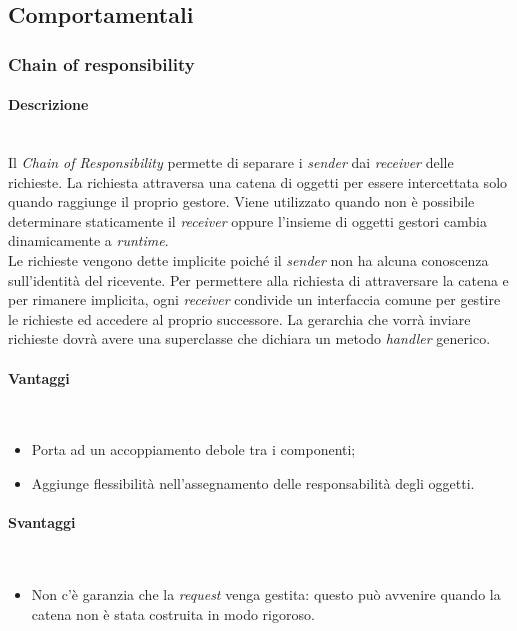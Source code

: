 \subsection{Comportamentali}
\subsubsection{Chain of responsibility}
\paragraph{Descrizione} \mbox{} \\
Il \textit{Chain of Responsibility} permette di separare i \textit{sender} dai \textit{receiver} delle richieste. La richiesta attraversa una catena di oggetti per essere intercettata solo quando raggiunge il proprio gestore. Viene utilizzato quando non è possibile determinare staticamente il \textit{receiver} oppure l’insieme di oggetti gestori cambia dinamicamente a \textit{runtime}. \\
Le richieste vengono dette implicite poiché il \textit{sender} non ha alcuna conoscenza sull’identità del ricevente. Per permettere alla richiesta di attraversare la catena e per rimanere implicita, ogni \textit{receiver} condivide un interfaccia comune per gestire le richieste ed accedere al proprio successore. La gerarchia che vorrà inviare richieste dovrà avere una superclasse che dichiara un metodo \textit{handler} generico.
\paragraph{Vantaggi} \mbox{} \\
\begin{itemize}
\item Porta ad un accoppiamento debole tra i componenti;
\item Aggiunge flessibilità nell’assegnamento delle responsabilità degli oggetti.
\end{itemize}
\paragraph{Svantaggi} \mbox{} \\
\begin{itemize}
\item Non c’è garanzia che la \textit{request} venga gestita: questo può avvenire quando la catena non è stata costruita in modo rigoroso.
\end{itemize}
